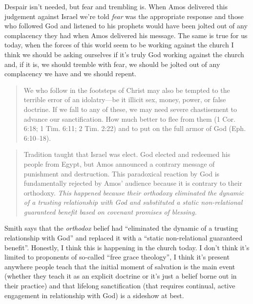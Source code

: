 Despair isn't needed, but fear and trembling is. When Amos delivered this
judgement against Israel we're told \textit{fear} was the appropriate response
and those who followed God and listened to his prophets would have been jolted
out of any complacency they had when Amos delivered his message. The same is
true for us today, when the forces of this world seem to be working against the
church I think we should be asking ourselves if it's truly God working against
the church and, if it is, we should tremble with fear, we should be jolted out
of any complacency we have and we should repent.

\begin{quote}
    We who follow in the footsteps of Christ may also be tempted to the terrible
    error of an idolatry---be it illicit sex, money, power, or false doctrine.
    If we fall to any of these, we may need severe chastisement to advance our
    sanctification. How much better to flee from them (1 Cor. 6:18; 1 Tim. 6:11;
    2 Tim. 2:22) and to put on the full armor of God (Eph. 6:10--18).
    \autocite[388-389]{mccomiskey:2009}
\end{quote}

\begin{quote}
    Tradition taught that Israel was elect. God elected and redeemed his people
    from Egypt, but Amos announced a contrary message of punishment and
    destruction. This paradoxical reaction by God is fundamentally rejected by
    Amos' audience because it is contrary to their orthodoxy. \textit{This
    happened because their orthodoxy eliminated the dynamic of a trusting
    relationship with God and substituted a static non-relational guaranteed
    benefit based on covenant promises of blessing.}
    \autocite[154, emphasis mine]{smith:2017}
\end{quote}

Smith says that the \textit{orthodox} belief had \enquote{eliminated the dynamic
of a trusting relationship with God} and replaced it with a \enquote{static
non-relational guaranteed benefit}. Honestly, I think this is happening in the
church today. I don't think it's limited to proponents of so-called
\enquote{free grace theology}, I think it's present anywhere people teach that
the initial moment of salvation is the main event (whether they teach it as an
explicit doctrine or it's just a belief borne out in their practice) and that
lifelong sanctification (that requires continual, active engagement in
relationship with God) is a sideshow at best.

